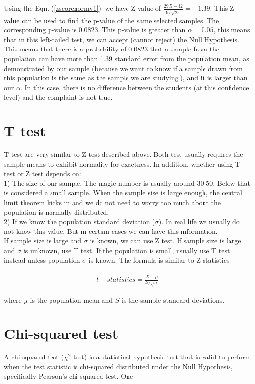 Using the Eqn. (\ref{zscorenormv1}), we have Z value of $\frac{29.5-32}{9/\sqrt{25}} = -1.39$. This Z value can be used to find the p-value of the same selected samples. The corresponding p-value is 0.0823. This p-value is greater than $\alpha=0.05$, this means that in this left-tailed test, we can accept (cannot reject) the Null Hypothesis. This means that there is a probability of 0.0823 that a sample from the population can have more than 1.39 standard error from the population mean, as demonstrated by our sample (because we want to know if a sample drawn from this population is the same as the sample we are studying.), and it is larger than our $\alpha$. In this case, there is no difference between the students (at this confidence level) and the complaint is not true.

\section{T test}
\label{ttest}

T test are very similar to Z test described above. Both test usually requires the sample means to exhibit normality for exactness. In addition, whether using T test or Z test depends on:\\

1) The size of our sample. The magic number is usually around 30-50. Below that is considered a small sample. When the sample size is large enough, the central limit theorem kicks in and we do not need to worry too much about the population is normally distributed. \\

2) If we know the population standard deviation ($\sigma$). In real life we usually do not know this value. But in certain cases we can have this information. \\

If sample size is large and $\sigma$ is known, we can use Z test. If sample size is large and $\sigma$ is unknown, use T test. If the population is small, usually use T test instead unless population $\sigma$ is known. The formula is similar to Z-statistics:

\begin{eqnarray}
t-statistics = \frac{\bar{X} - \mu}{S/\sqrt{n}}
\end{eqnarray}

where $\mu$ is the population mean and $S$ is the sample standard deviations. 



\section{Chi-squared test}
A chi-squared test ($\chi^2$ test) is a statistical hypothesis test that is valid to perform when the test statistic is chi-squared distributed under the Null Hypothesis, specifically Pearson's chi-squared test. One

